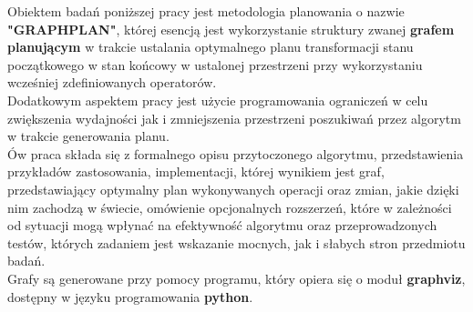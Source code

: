 \begin{streszczenie}
Obiektem badań poniższej pracy jest metodologia planowania
o nazwie \textbf{"GRAPHPLAN"}, której esencją jest wykorzystanie
struktury zwanej \textbf{grafem planującym} w trakcie ustalania optymalnego planu transformacji
stanu początkowego w stan końcowy w ustalonej przestrzeni przy wykorzystaniu wcześniej zdefiniowanych
operatorów. \\
Dodatkowym aspektem pracy jest użycie programowania ograniczeń w celu zwiększenia wydajności jak i zmniejszenia
przestrzeni poszukiwań przez algorytm w trakcie generowania planu. \\
Ów praca składa się z formalnego opisu przytoczonego algorytmu, przedstawienia przykładów zastosowania,
implementacji, której wynikiem jest graf, przedstawiający optymalny plan wykonywanych operacji oraz zmian, jakie dzięki nim zachodzą w świecie,
omówienie opcjonalnych rozszerzeń, które w zależności od sytuacji mogą wpłynać na efektywność algorytmu
oraz przeprowadzonych testów, których zadaniem jest wskazanie mocnych, jak i słabych stron przedmiotu badań. \\
Grafy są generowane przy pomocy programu, który opiera się o moduł \textbf{graphviz}, dostępny w języku programowania \textbf{python}.

\end{streszczenie}
